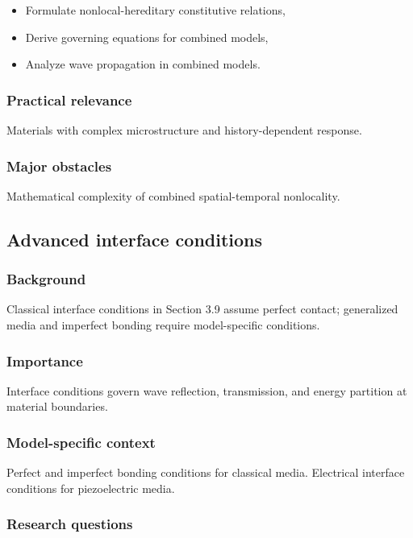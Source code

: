 \begin{itemize}
\item Formulate nonlocal-hereditary constitutive relations,
\item Derive governing equations for combined models,
\item Analyze wave propagation in combined models.
\end{itemize}

\subsubsection{Practical relevance}

Materials with complex microstructure and history-dependent response.

\subsubsection{Major obstacles}

Mathematical complexity of combined spatial-temporal nonlocality.

\subsection{Advanced interface conditions}
\label{sec:advanced-interfaces}

\subsubsection{Background}

Classical interface conditions in Section 3.9 assume perfect contact; generalized media and imperfect bonding require model-specific conditions.

\subsubsection{Importance}

Interface conditions govern wave reflection, transmission, and energy partition at material boundaries.

\subsubsection{Model-specific context}

Perfect and imperfect bonding conditions for classical media. Electrical interface conditions for piezoelectric media.

\subsubsection{Research questions}

